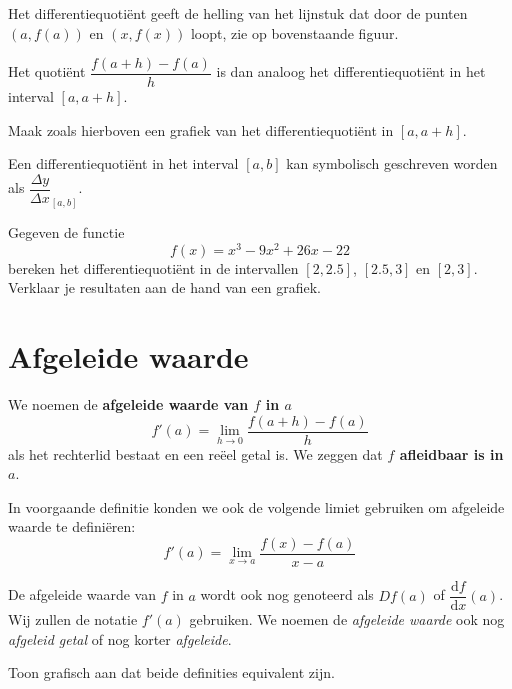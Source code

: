 \documentclass[12pt]{article}
\newenvironment{definitie}
{
  \begin{mdframed}[nobreak=true,frametitle={Definitie}]
  }{%
  \end{mdframed}
}
\begin{document}
Het differentiequotiënt geeft de helling van het lijnstuk dat door de punten $(a,f(a))$ en $(x,f(x))$ loopt, zie op bovenstaande figuur.

Het quotiënt $\dfrac{f(a+h)-f(a)}{h}$ is dan analoog het differentiequotiënt in het interval $[a, a+h]$.

\begin{oefening}
  Maak zoals hierboven een grafiek van het differentiequotiënt in $[a, a+h]$.
\end{oefening}

Een differentiequotiënt in het interval $[a,b]$ kan symbolisch geschreven worden als $\dfrac{\Delta y}{\Delta x}_{[a,b]}$.

\begin{oefening}
  Gegeven de functie
  $$f(x)=x^3-9x^2+26x-22$$
  bereken het differentiequotiënt in de intervallen $[2,2.5]$, $[2.5,3]$ en $[2,3]$. Verklaar je resultaten aan de hand van een grafiek.

\end{oefening}

\pagebreak
\section{Afgeleide waarde}
\begin{definitie}
  We noemen de {\bf afgeleide waarde van $f$ in $a$}
  $$f'(a)=\lim_{h\to 0}\dfrac{f(a+h)-f(a)}{h}$$
  als het rechterlid bestaat en een reëel getal is. We zeggen dat {\bf $f$ afleidbaar is in $a$}.
\end{definitie}

In voorgaande definitie konden we ook de volgende limiet gebruiken om afgeleide waarde te definiëren:
$$f'(a)=\lim_{x\to a}\dfrac{f(x)-f(a)}{x-a}$$

De afgeleide waarde van $f$ in $a$ wordt ook nog genoteerd als $Df(a)$ of $\dfrac{\mbox{d}f}{\mbox{d}x}(a)$. Wij zullen de notatie $f'(a)$ gebruiken. We noemen de {\em afgeleide waarde} ook nog {\em afgeleid getal} of nog korter {\em afgeleide}.

\begin{oefening}
  Toon grafisch aan dat beide definities equivalent zijn.
\end{oefening}
\end{document}
